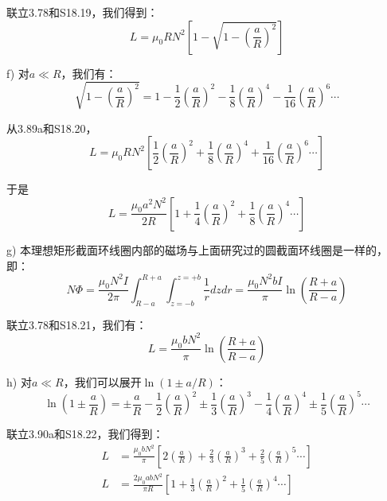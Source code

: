 联立3.78和S18.19，我们得到：
 \begin{equation}%
L=\mu_0RN^2\left[1-\sqrt{1-\left(\frac{a}{R}\right)^2}\right]
\end{equation}

f) 对$a\ll R$，我们有：
\begin{equation}%
\sqrt{1-\left(\frac{a}{R}\right)^2}=1-\frac{1}{2}(\frac{a}{R})^2-\frac{1}{8}(\frac{a}{R})^4-\frac{1}{16}(\frac{a}{R})^6\cdots
\end{equation}

从3.89a和S18.20，
\begin{equation}
L=\mu_0RN^2\left[\frac{1}{2}(\frac{a}{R})^2+\frac{1}{8}(\frac{a}{R})^4+\frac{1}{16}(\frac{a}{R})^6\cdots\right]
\end{equation}

于是
 \begin{equation}%
L=\frac{\mu_0a^2N^2}{2R}\left[1+\frac{1}{4}(\frac{a}{R})^2+\frac{1}{8}(\frac{a}{R})^4\cdots\right]
\end{equation}

g) 本理想矩形截面环线圈内部的磁场与上面研究过的圆截面环线圈是一样的，即：
 \begin{equation}%
N\Phi=\frac{\mu_0N^2I}{2\pi}\int_{R-a}^{R+a}\int_{z=-b}^{z=+b}\frac{1}{r}dzdr
=\frac{\mu_0N^2bI}{\pi}\ln\left(\frac{R+a}{R-a}\right)
\end{equation}

联立3.78和S18.21，我们有：
 \begin{equation}%
L=\frac{\mu_0bN^2}{\pi}\ln\left(\frac{R+a}{R-a}\right)
\end{equation}

h) 对$a\ll R$，我们可以展开$\ln(1\pm a/R)$：
 \begin{equation}%
\ln(1\pm\frac{a}{R})=\pm\frac{a}{R}-\frac{1}{2}(\frac{a}{R})^2\pm\frac{1}{3}(\frac{a}{R})^3-\frac{1}{4}(\frac{a}{R})^4\pm\frac{1}{5}(\frac{a}{R})^5\cdots
\end{equation}

联立3.90a和S18.22，我们得到：
 \begin{eqnarray}%
L&=\frac{\mu_0bN^2}{\pi}\left[2(\frac{a}{R})+\frac{2}{3}(\frac{a}{R})^3+\frac{2}{5}(\frac{a}{R})^5\cdots\right]\\
L&=\frac{2\mu_0abN^2}{\pi R}\left[1+\frac{1}{3}(\frac{a}{R})^2+\frac{1}{5}(\frac{a}{R})^4\cdots\right]
\end{eqnarray}

\newpage



